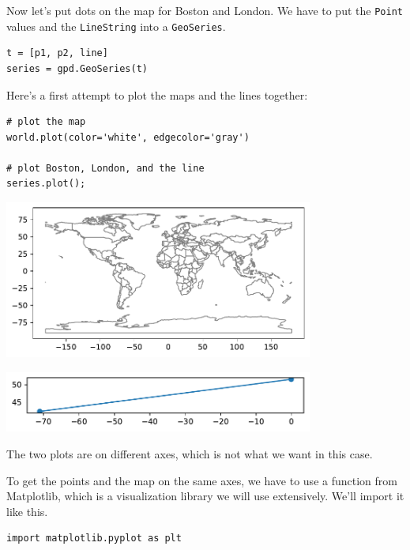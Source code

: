 Now let's put dots on the map for Boston and London. We have to put the
\passthrough{\lstinline!Point!} values and the
\passthrough{\lstinline!LineString!} into a
\passthrough{\lstinline!GeoSeries!}.

\begin{lstlisting}[]
t = [p1, p2, line]
series = gpd.GeoSeries(t)
\end{lstlisting}

Here's a first attempt to plot the maps and the lines together:

\begin{lstlisting}[]
# plot the map
world.plot(color='white', edgecolor='gray')

# plot Boston, London, and the line
series.plot();
\end{lstlisting}

\begin{center}
\includegraphics[width=4in]{chapters/02_times_files/02_times_126_0.pdf}
\end{center}

\begin{center}
\includegraphics[width=4in]{chapters/02_times_files/02_times_126_1.pdf}
\end{center}

The two plots are on different axes, which is not what we want in this
case.

To get the points and the map on the same axes, we have to use a
function from Matplotlib, which is a visualization library we will use
extensively. We'll import it like this.

\begin{lstlisting}[]
import matplotlib.pyplot as plt
\end{lstlisting}

